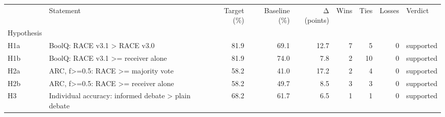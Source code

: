 \begin{tabular}{llrrrrrrl}
\toprule
 & Statement & Target (\%) & Baseline (\%) & Δ (points) & Wins & Ties & Losses & Verdict \\
Hypothesis &  &  &  &  &  &  &  &  \\
\midrule
H1a & BoolQ: RACE v3.1 > RACE v3.0 & 81.9 & 69.1 & 12.7 & 7 & 5 & 0 & supported \\
H1b & BoolQ: RACE v3.1 >= receiver alone & 81.9 & 74.0 & 7.8 & 2 & 10 & 0 & supported \\
H2a & ARC, f>=0.5: RACE >= majority vote & 58.2 & 41.0 & 17.2 & 2 & 4 & 0 & supported \\
H2b & ARC, f>=0.5: RACE >= receiver alone & 58.2 & 49.7 & 8.5 & 3 & 3 & 0 & supported \\
H3 & Individual accuracy: informed debate > plain debate & 68.2 & 61.7 & 6.5 & 1 & 1 & 0 & supported \\
\bottomrule
\end{tabular}
